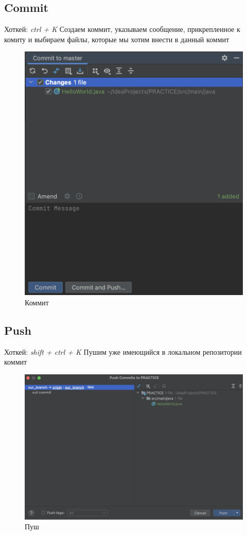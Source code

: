 \documentclass[12pt, a4paper]{article}
\begin{document}
    \subsection{Commit}

    Хоткей: \textit{ctrl + K}
    Создаем коммит, указываем сообщение, прикрепленное к комиту и выбираем файлы, которые мы хотим
    внести в данный коммит

    \begin{figure}[H]
        \centering
        \includegraphics[width=0.55\linewidth]{src/commit.png}
        \caption{Коммит}
    \end{figure}

    \subsection{Push}

    Хоткей: \textit{shift + ctrl + K}
    Пушим уже имеющийся в локальном репозитории коммит

    \begin{figure}[H]
        \centering
        \includegraphics[width=0.75\linewidth]{src/push.png}
        \caption{Пуш}
    \end{figure}
\end{document}
